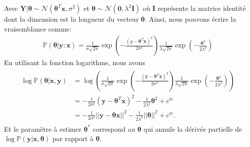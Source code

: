 \documentclass[letterpaper,11pt,english]{sphinxmanual}
\begin{document}
\sphinxAtStartPar
Avec
\(\mathbf{Y}| \boldsymbol{\theta} \sim \mathcal{N}(\boldsymbol{\theta}^T \mathbf{x}, \sigma^2)\)
et
\(\boldsymbol{\theta} \sim \mathcal{N}(\mathbf{0}, \lambda^2 \mathbf{I})\)
où \(\mathbf{I}\) représente la matrice identité dont la dimension
est la longueur du vecteur \(\boldsymbol{\theta}\). Ainsi, nous
pouvons écrire la vraisemblance comme:
\begin{equation}\label{equation:chapter3:chapter3:17}
\begin{split}\mathbb{P}(\boldsymbol{\theta}| \mathbf{y};\mathbf{x}) = \frac{1}{\sigma \sqrt{2\pi }}\exp{\left(-\frac{(y - \boldsymbol{\theta}^T \mathbf{x})^2}{2 \sigma^2}\right)} \frac{1}{\lambda \sqrt{2\pi }} \operatorname{exp}\left(-\frac{\boldsymbol{\theta}^2}{2 \lambda^2}\right)\end{split}
\end{equation}
\sphinxAtStartPar
En utilisant la fonction logarithme, nous avons
\begin{equation}\label{equation:chapter3:chapter3:18}
\begin{split}\begin{aligned}
 \log \mathbb{P}(\boldsymbol{\theta}|\mathbf{x}, \mathbf{y}) &= \log\left(\frac{1}{\sigma \sqrt{2\pi }}\operatorname{exp}\left(-\frac{(\mathbf{y} - \boldsymbol{\theta}^T \mathbf{x})^2}{2 \sigma^2}\right) \frac{1}{\lambda \sqrt{2\pi }}\exp{\left(-\frac{\boldsymbol{\theta}^2}{2 \lambda^2}\right)} \right)\\
 &= -\frac{1}{2 \sigma^2}(\mathbf{y} - \boldsymbol{\theta}^T \mathbf{x})^2 -\frac{1}{2 \lambda^2}\boldsymbol{\theta} ^2 + c^{te}
\\
& = -\frac{1}{2 \sigma^2}||\mathbf{y} - \boldsymbol{\theta} \mathbf{x}||^2 -\frac{1}{2 \lambda^2}||\boldsymbol{\theta}|| ^2 + c^{te}.\end{aligned}\end{split}
\end{equation}
\sphinxAtStartPar
Et le paramètre à estimer \(\boldsymbol{\theta}^*\) correspond au
\(\boldsymbol{\theta}\) qui annule la dérivée partielle de
\(\log \mathbb{P}(\mathbf{y}| \mathbf{x}, \boldsymbol{\theta})\) par
rapport à \(\boldsymbol{\theta}\).
\end{document}
